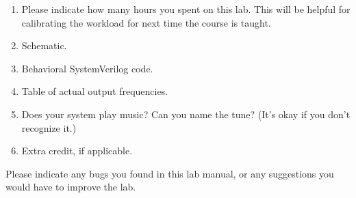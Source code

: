\documentclass{../../e85}
\date{2019 March 3 (Monday)}
\author{}
\begin{document}
\begin{enumerate}
\item Please indicate how many hours you spent on this lab.  This will
  be helpful for calibrating the workload for next time the course is
  taught.

  \begin{solution}

  \end{solution}

\item Schematic.

  \begin{solution}

  \end{solution}

\item Behavioral SystemVerilog code.

  \begin{solution}

  \end{solution}

\item Table of actual output frequencies.

  \begin{solution}

  \end{solution}

\item Does your system play music?  Can you name the tune?  (It's okay
  if you don't recognize it.)

  \begin{solution}

  \end{solution}

\item Extra credit, if applicable.

  \begin{solution}

  \end{solution}
\end{enumerate}

Please indicate any bugs you found in this lab manual, or any
suggestions you would have to improve the lab.
\begin{solution}

\end{solution}
\end{document}
